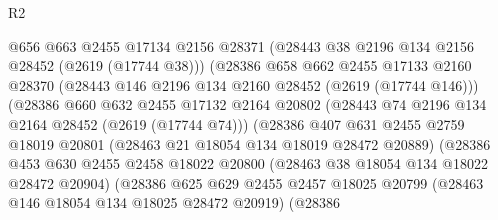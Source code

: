 \begin{lexlean}{R2}
\begin{coremodule}
                                      @656
                                      @663
                                      @2455
                                      @17134
                                      @2156
                                      @28371
                                      (@28443 @38 @2196 @134 @2156 @28452 (@2619 (@17744 @38)))
                                      (@28386
                                        @658
                                        @662
                                        @2455
                                        @17133
                                        @2160
                                        @28370
                                        (@28443 @146 @2196 @134 @2160 @28452 (@2619 (@17744 @146)))
                                        (@28386
                                          @660
                                          @632
                                          @2455
                                          @17132
                                          @2164
                                          @20802
                                          (@28443 @74 @2196 @134 @2164 @28452 (@2619 (@17744 @74)))
                                          (@28386
                                            @407
                                            @631
                                            @2455
                                            @2759
                                            @18019
                                            @20801
                                            (@28463 @21 @18054 @134 @18019 @28472 @20889)
                                            (@28386
                                              @453
                                              @630
                                              @2455
                                              @2458
                                              @18022
                                              @20800
                                              (@28463 @38 @18054 @134 @18022 @28472 @20904)
                                              (@28386
                                                @625
                                                @629
                                                @2455
                                                @2457
                                                @18025
                                                @20799
                                                (@28463 @146 @18054 @134 @18025 @28472 @20919)
                                                (@28386

\end{coremodule}
\end{lexlean}

